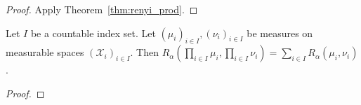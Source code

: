 \begin{proof}
Apply Theorem~\ref{thm:renyi_prod}.
\end{proof}

\begin{theorem}
  \label{thm:renyi_prod_countable}
  Let $I$ be a countable index set. Let $(\mu_i)_{i \in I}, (\nu_i)_{i \in I}$ be measures on measurable spaces $(\mathcal X_i)_{i \in I}$.
  Then $R_\alpha (\prod_{i \in I} \mu_i, \prod_{i \in I} \nu_i) = \sum_{i \in I} R_\alpha(\mu_i, \nu_i)$.
\end{theorem}

\begin{proof}
\end{proof}
